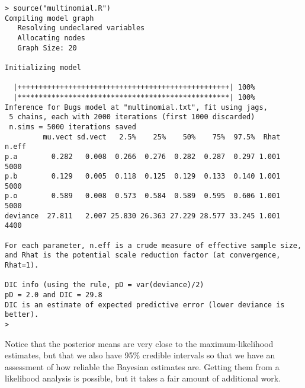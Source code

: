 \begin{verbatim}
> source("multinomial.R")
Compiling model graph
   Resolving undeclared variables
   Allocating nodes
   Graph Size: 20

Initializing model

  |++++++++++++++++++++++++++++++++++++++++++++++++++| 100%
  |**************************************************| 100%
Inference for Bugs model at "multinomial.txt", fit using jags,
 5 chains, each with 2000 iterations (first 1000 discarded)
 n.sims = 5000 iterations saved
         mu.vect sd.vect   2.5%    25%    50%    75%  97.5%  Rhat n.eff
p.a        0.282   0.008  0.266  0.276  0.282  0.287  0.297 1.001  5000
p.b        0.129   0.005  0.118  0.125  0.129  0.133  0.140 1.001  5000
p.o        0.589   0.008  0.573  0.584  0.589  0.595  0.606 1.001  5000
deviance  27.811   2.007 25.830 26.363 27.229 28.577 33.245 1.001  4400

For each parameter, n.eff is a crude measure of effective sample size,
and Rhat is the potential scale reduction factor (at convergence, Rhat=1).

DIC info (using the rule, pD = var(deviance)/2)
pD = 2.0 and DIC = 29.8
DIC is an estimate of expected predictive error (lower deviance is better).
>
\end{verbatim}
Notice that the posterior means are very close to the
maximum-likelihood estimates, but that we also have 95\% credible
intervals so that we have an assessment of how reliable the Bayesian
estimates are. Getting them from a likelihood analysis is possible,
but it takes a fair amount of additional work.

